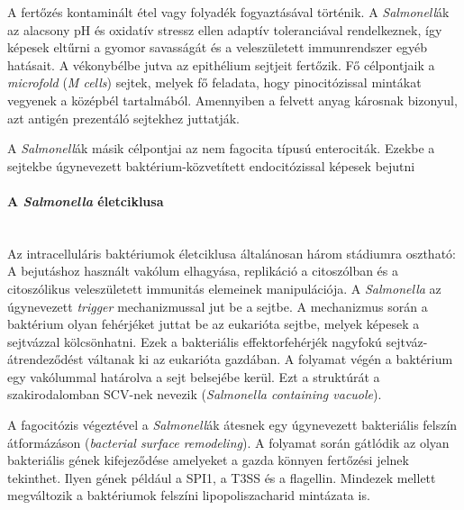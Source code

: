 \documentclass[a4paper,12pt]{article}
\begin{document}
		A fertőzés kontaminált étel vagy folyadék fogyaztásával történik. A \textit{Salmonell}ák az alacsony pH és oxidatív stressz ellen adaptív toleranciával rendelkeznek, így képesek eltűrni a gyomor savasságát és a veleszületett immunrendszer egyéb hatásait. A vékonybélbe jutva az epithélium sejtjeit fertőzik. Fő célpontjaik a \textit{microfold} (\textit{M cells}) sejtek, melyek fő feladata, hogy pinocitózissal mintákat vegyenek a középbél tartalmából. Amennyiben a felvett anyag károsnak bizonyul, azt antigén prezentáló sejtekhez juttatják. \cite{salmonella_and_host_cell_nature}
		
		A \textit{Salmonell}ák másik célpontjai az nem fagocita típusú enterociták. Ezekbe a sejtekbe úgynevezett baktérium-közvetített endocitózissal képesek bejutni \cite{salmonella_and_host_cell_nature}
		
		
		\paragraph{A \textit{Salmonella} életciklusa} \mbox{}\\
		Az intracelluláris baktériumok életciklusa általánosan három stádiumra osztható: A bejutáshoz használt vakólum elhagyása, replikáció a citoszólban és a citoszólikus veleszületett immunitás elemeinek manipulációja. A \textit{Salmonella} az úgynevezett \textit{trigger} mechanizmussal jut be a sejtbe. A mechanizmus során a baktérium olyan fehérjéket juttat be az eukarióta sejtbe, melyek képesek a sejtvázzal kölcsönhatni. Ezek a bakteriális effektorfehérjék nagyfokú sejtváz-átrendeződést váltanak ki az eukarióta gazdában. A folyamat végén a baktérium egy vakólummal határolva a sejt belsejébe kerül. \cite{salmonella_autophagy_nature_old} Ezt a struktúrát a szakirodalomban SCV-nek nevezik (\textit{Salmonella containing vacuole}). \cite{salmonella_and_host_cell_nature}
		
		A fagocitózis végeztével a \textit{Salmonell}ák átesnek egy úgynevezett bakteriális felszín átformázáson (\textit{bacterial surface remodeling}). A folyamat során gátlódik az olyan bakteriális gének kifejeződése amelyeket a gazda könnyen fertőzési jelnek tekinthet. Ilyen gének például a SPI1, a T3SS és a flagellin. Mindezek mellett megváltozik a baktériumok felszíni lipopoliszacharid mintázata is.  \cite{salmonella_and_host_cell_nature}
		
\end{document}
